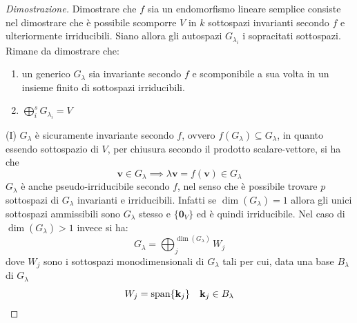     \begin{proof}[Dimostrazione]
        Dimostrare che $f$ sia un endomorfismo lineare semplice consiste nel dimostrare che è possibile scomporre $V$ in $k$ sottospazi invarianti secondo $f$ e ulteriormente irriducibili. Siano allora gli autospazi $G_{\lambda_i}$ i sopracitati sottospazi.
        Rimane da dimostrare che:
        \begin{enumerate}[label=(\Roman*)]
            \item un generico $G_{\lambda}$ sia invariante secondo $f$ e scomponibile a sua volta in un insieme finito di sottospazi irriducibili.
            \item $\displaystyle \bigoplus_{i}^{s} G_{\lambda_i} = V$
        \end{enumerate}

        \vspace{10pt}
        (I)
        $G_{\lambda}$ è sicuramente invariante secondo $f$, ovvero $f(G_{\lambda}) \subseteq G_{\lambda}$, in quanto essendo sottospazio di $V$, per chiusura secondo il prodotto scalare-vettore, si ha che
        \[
            \mathbf{v} \in G_{\lambda} \implies \lambda \mathbf{v} = f(\mathbf{v}) \in G_{\lambda}
        \]
        $G_{\lambda}$ è anche pseudo-irriducibile secondo $f$, nel senso che è possibile trovare $p$ sottospazi di $G_{\lambda}$ invarianti e irriducibili. Infatti se $\dim(G_{\lambda}) = 1$ allora gli unici sottospazi ammissibili sono $G_{\lambda}$ stesso e $\{ \mathbf{0}_V \}$ ed è quindi irriducibile.
        Nel caso di $\dim(G_{\lambda}) > 1$ invece si ha:
        \[
            G_{\lambda} = \bigoplus_{j}^{\dim(G_{\lambda})} W_j
        \]
        dove $W_j$ sono i sottospazi monodimensionali di $G_{\lambda}$ tali per cui, data una base $B_{\lambda}$ di $G_{\lambda}$
        \[
            W_j = \textnormal{span}\{ \mathbf{k}_{j} \} \quad \mathbf{k}_{j} \in B_{\lambda}
        \]


\end{proof}
